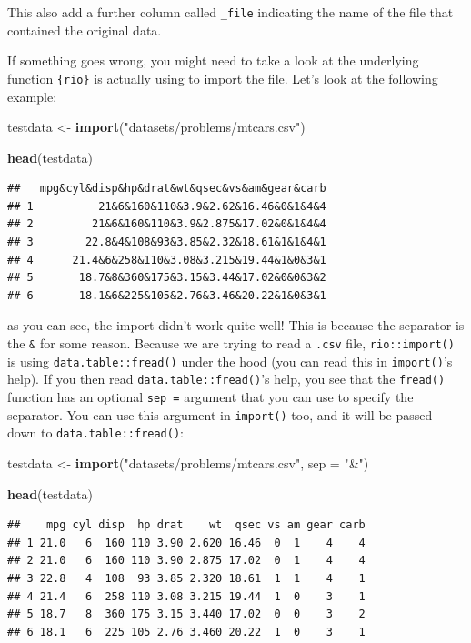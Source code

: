 \documentclass[]{gitbook}
\newenvironment{Shaded}{\begin{snugshade}}{\end{snugshade}}
\newcommand{\DataTypeTok}[1]{\textcolor[rgb]{0.13,0.29,0.53}{#1}}
\newcommand{\KeywordTok}[1]{\textcolor[rgb]{0.13,0.29,0.53}{\textbf{#1}}}
\newcommand{\NormalTok}[1]{#1}
\newcommand{\StringTok}[1]{\textcolor[rgb]{0.31,0.60,0.02}{#1}}
\theoremstyle{definition}
\theoremstyle{definition}
\theoremstyle{definition}
\theoremstyle{remark}
\begin{document}
This also add a further column called \texttt{\_file} indicating the
name of the file that contained the original data.

If something goes wrong, you might need to take a look at the underlying
function \texttt{\{rio\}} is actually using to import the file. Let's
look at the following example:

\begin{Shaded}
\begin{Highlighting}[]
\NormalTok{testdata <-}\StringTok{ }\KeywordTok{import}\NormalTok{(}\StringTok{"datasets/problems/mtcars.csv"}\NormalTok{)}

\KeywordTok{head}\NormalTok{(testdata)}
\end{Highlighting}
\end{Shaded}

\begin{verbatim}
##   mpg&cyl&disp&hp&drat&wt&qsec&vs&am&gear&carb
## 1          21&6&160&110&3.9&2.62&16.46&0&1&4&4
## 2         21&6&160&110&3.9&2.875&17.02&0&1&4&4
## 3        22.8&4&108&93&3.85&2.32&18.61&1&1&4&1
## 4      21.4&6&258&110&3.08&3.215&19.44&1&0&3&1
## 5       18.7&8&360&175&3.15&3.44&17.02&0&0&3&2
## 6       18.1&6&225&105&2.76&3.46&20.22&1&0&3&1
\end{verbatim}

as you can see, the import didn't work quite well! This is because the
separator is the \texttt{\&} for some reason. Because we are trying to
read a \texttt{.csv} file, \texttt{rio::import()} is using
\texttt{data.table::fread()} under the hood (you can read this in
\texttt{import()}'s help). If you then read
\texttt{data.table::fread()}'s help, you see that the \texttt{fread()}
function has an optional \texttt{sep\ =} argument that you can use to
specify the separator. You can use this argument in \texttt{import()}
too, and it will be passed down to \texttt{data.table::fread()}:

\begin{Shaded}
\begin{Highlighting}[]
\NormalTok{testdata <-}\StringTok{ }\KeywordTok{import}\NormalTok{(}\StringTok{"datasets/problems/mtcars.csv"}\NormalTok{, }\DataTypeTok{sep =} \StringTok{"&"}\NormalTok{)}

\KeywordTok{head}\NormalTok{(testdata)}
\end{Highlighting}
\end{Shaded}

\begin{verbatim}
##    mpg cyl disp  hp drat    wt  qsec vs am gear carb
## 1 21.0   6  160 110 3.90 2.620 16.46  0  1    4    4
## 2 21.0   6  160 110 3.90 2.875 17.02  0  1    4    4
## 3 22.8   4  108  93 3.85 2.320 18.61  1  1    4    1
## 4 21.4   6  258 110 3.08 3.215 19.44  1  0    3    1
## 5 18.7   8  360 175 3.15 3.440 17.02  0  0    3    2
## 6 18.1   6  225 105 2.76 3.460 20.22  1  0    3    1
\end{verbatim}
\end{document}

